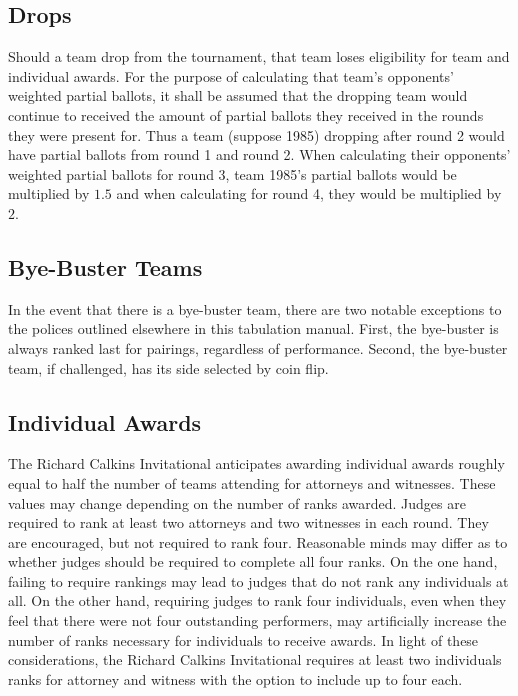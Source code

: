 \documentclass{article}
\begin{document}
\subsection{Drops}
Should a team drop from the tournament, that team loses eligibility for team and individual awards.  For the purpose of calculating that team's opponents' weighted partial ballots, it shall be assumed that the dropping team would continue to received the amount of partial ballots they received in the rounds they were present for.  Thus a team (suppose 1985) dropping after round 2 would have partial ballots from round 1 and round 2.  When calculating their opponents' weighted partial ballots for round 3, team 1985's partial ballots would be multiplied by $1.5$ and when calculating for round 4, they would be multiplied by $2$.
\subsection{Bye-Buster Teams}
In the event that there is a bye-buster team, there are two notable exceptions to the polices outlined elsewhere in this tabulation manual.  First, the bye-buster is always ranked last for pairings, regardless of performance.  Second, the bye-buster team, if challenged, has its side selected by coin flip. %
\subsection{Individual Awards}
The Richard Calkins Invitational anticipates awarding individual awards roughly equal to half the number of teams attending for attorneys and witnesses.  These values may change depending on the number of ranks awarded.  Judges are required to rank at least two attorneys and two witnesses in each round.  They are encouraged, but not required to rank four.  Reasonable minds may differ as to whether judges should be required to complete all four ranks.  On the one hand, failing to require rankings may lead to judges that do not rank any individuals at all.  On the other hand, requiring judges to rank four individuals, even when they feel that there were not four outstanding performers, may artificially increase the number of ranks necessary for individuals to receive awards.  In light of these considerations, the Richard Calkins Invitational requires at least two individuals ranks for attorney and witness with the option to include up to four each.
\end{document}
